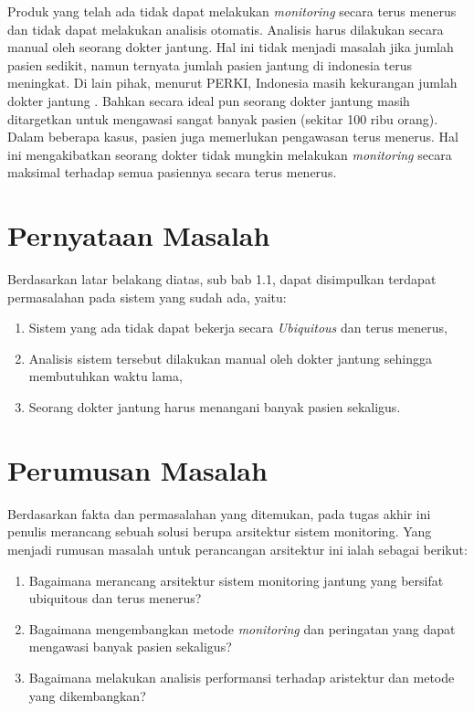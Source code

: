Produk yang telah ada tidak dapat melakukan \textit{monitoring} secara terus menerus dan tidak dapat melakukan analisis otomatis. Analisis harus dilakukan secara manual oleh seorang dokter jantung. Hal ini tidak menjadi masalah jika jumlah pasien sedikit, namun ternyata jumlah pasien jantung di indonesia terus meningkat. Di lain pihak, menurut PERKI, Indonesia masih kekurangan jumlah dokter jantung \cite{doctor_deff}. Bahkan secara ideal pun seorang dokter jantung masih ditargetkan untuk mengawasi sangat banyak pasien (sekitar 100 ribu orang)\cite{doctor_deff}. Dalam beberapa kasus, pasien juga memerlukan pengawasan terus menerus. Hal ini mengakibatkan seorang dokter tidak mungkin melakukan \textit{monitoring} secara maksimal terhadap semua pasiennya secara terus menerus.


\section{Pernyataan Masalah}
Berdasarkan latar belakang diatas, sub bab 1.1, dapat disimpulkan terdapat permasalahan pada sistem yang sudah ada, yaitu:
\begin{enumerate}
	\item Sistem yang ada tidak dapat bekerja secara \textit{Ubiquitous} dan terus menerus,
	\item Analisis sistem tersebut dilakukan manual oleh dokter jantung sehingga membutuhkan waktu lama,
	\item Seorang dokter jantung harus menangani banyak pasien sekaligus.
\end{enumerate}

\section{Perumusan Masalah}
Berdasarkan fakta dan permasalahan yang ditemukan, pada tugas akhir ini penulis merancang sebuah solusi berupa arsitektur sistem monitoring. Yang menjadi rumusan masalah untuk perancangan arsitektur ini ialah sebagai berikut:
\begin{enumerate}
	\item Bagaimana merancang arsitektur sistem monitoring jantung yang bersifat ubiquitous dan terus menerus?
	\item Bagaimana mengembangkan metode \textit{monitoring} dan peringatan yang dapat mengawasi banyak pasien sekaligus?
	\item Bagaimana melakukan analisis performansi terhadap aristektur dan metode yang dikembangkan?
\end{enumerate}
